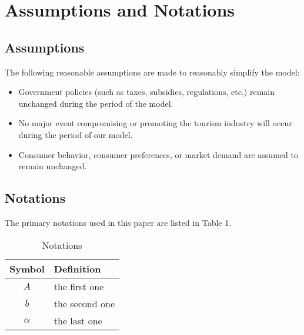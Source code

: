 \section{Assumptions and Notations}

\subsection{Assumptions}

The following reasonable assumptions are made to reasonably simplify the model:

\begin{itemize}
  \item Government policies (such as taxes, subsidies, regulations, etc.) remain unchanged during the period of the model.
  \item No major event compromising or promoting the tourism industry will occur during the period of our model.
  \item Consumer behavior, consumer preferences, or market demand are assumed to remain unchanged.
\end{itemize}


\subsection{Notations}

The primary notations used in this paper are listed in Table 1.

\begin{table}[!htbp]
  \begin{center}
  \caption{Notations}
  \begin{tabular}{cl}
    \toprule
    \multicolumn{1}{m{3cm}}{\centering Symbol}
    &\multicolumn{1}{m{8cm}}{\centering Definition}\\
    \midrule
    $A$&the first one\\
    $b$&the second one\\
    $\alpha$ &the last one\\
    \bottomrule
  \end{tabular}
  \end{center}
  \end{table}


